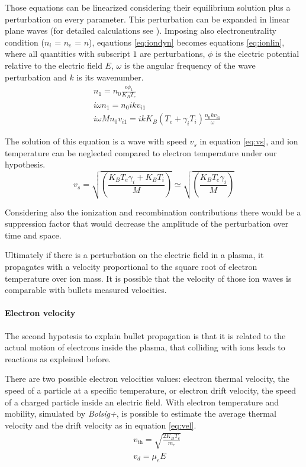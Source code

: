 Those equations can be linearized considering their equilibrium solution plus a perturbation on every parameter. This perturbation can be expanded in linear plane waves (for detailed calculations see \cite{book:567903}). Imposing also electroneutrality condition ($n_i$ = $n_e$ = $n$), eqautions \ref{eq:iondyn} becomes equations \ref{eq:ionlin}, where all quantities with subscript $1$ are perturbations, $\phi$ is the electric potential relative to the electric field $E$, $\omega$ is the angular frequency of the wave perturbation and $k$ is its wavenumber.
\begin{equation}
 \begin{split}
  &n_1 = n_0 \frac{e \phi_1}{K_B T_e}\\
  &i \omega n_1 = n_0 i k v_{i1}\\
  &i \omega M n_0 v_{i1} = i k K_B (T_e + \gamma_i T_i) \frac{n_0 k v_{i1}}{\omega}
 \end{split}
\label{eq:ionlin}
\end{equation}

The solution of this equation is a wave with speed $v_{s}$ in equation \ref{eq:vs}, and ion temperature can be neglected compared to electron temperature under our hypothesis.
\begin{equation}
 v_s = \sqrt{\left(\frac{K_B T_e \gamma_i + K_B T_i}{M}\right)} \simeq \sqrt{\left(\frac{K_B T_e \gamma_i}{M}\right)}
 \label{eq:vs}
\end{equation}

Considering also the ionization and recombination contributions there would be a suppression factor that would decrease the amplitude of the perturbation over time and space.

Ultimately if there is a perturbation on the electric field in a plasma, it propagates with a velocity proportional to the square root of electron temperature over ion mass. It is possible that the velocity of those ion waves is comparable with bullets measured velocities.


\paragraph{Electron velocity}
The second hypotesis to explain bullet propagation is that it is related to the actual motion of electrons inside the plasma, that colliding with ions leads to reactions as expleined before.

There are two possible electron velocities values: electron thermal velocity, the speed of a particle at a specific temperature, or electron drift velocity, the speed of a charged particle inside an electric field. With electron temperature and mobility, simulated by \emph{Bolsig+}, is possible to estimate the average thermal velocity and the drift velocity as in equation \ref{eq:vel}.
\begin{equation}
 \begin{split}
  &v_{\text{th}} = \sqrt{\frac{2 K_B T_e}{m_e}} \\
  &v_d = \mu_e E
 \end{split}
\label{eq:vel}
\end{equation}


